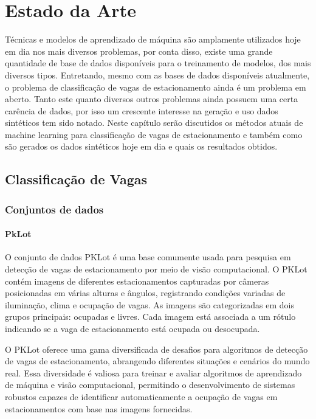 \chapter{Estado da Arte}


Técnicas e modelos de aprendizado de máquina são amplamente utilizados hoje em dia nos mais diversos problemas, por conta disso, existe uma grande quantidade de base de dados disponíveis para o treinamento de modelos, dos mais diversos tipos. Entretando, mesmo com as bases de dados disponíveis atualmente, o problema de classificação de vagas de estacionamento ainda é um problema em aberto\cite{systematic-review}. Tanto este quanto diversos outros problemas ainda possuem uma certa carência de dados, por isso um crescente interesse na geração e uso dados sintéticos tem sido notado. Neste capítulo serão discutidos os métodos atuais de machine learning para classificação de vagas de estacionamento e também como são gerados os dados sintéticos hoje em dia e quais os resultados obtidos.

\section{Classificação de Vagas}
\subsection{Conjuntos de dados}
\subsubsection{PkLot}

O conjunto de dados PKLot \cite{pklot2} é uma base comumente usada para pesquisa em detecção de vagas de estacionamento por meio de visão computacional. O PKLot contém imagens de diferentes estacionamentos capturadas por câmeras posicionadas em várias alturas e ângulos, registrando condições variadas de iluminação, clima e ocupação de vagas. As imagens são categorizadas em dois grupos principais: ocupadas e livres. Cada imagem está associada a um rótulo indicando se a vaga de estacionamento está ocupada ou desocupada.

O PKLot oferece uma gama diversificada de desafios para algoritmos de detecção de vagas de estacionamento, abrangendo diferentes situações e cenários do mundo real. Essa diversidade é valiosa para treinar e avaliar algoritmos de aprendizado de máquina e visão computacional, permitindo o desenvolvimento de sistemas robustos capazes de identificar automaticamente a ocupação de vagas em estacionamentos com base nas imagens fornecidas.

